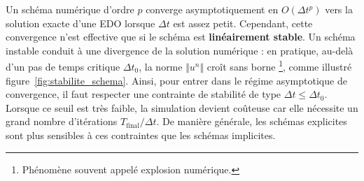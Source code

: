 Un schéma numérique d'ordre $p$ converge asymptotiquement en $O(\Delta t^p)$ vers la solution exacte d'une EDO lorsque $\Delta t$ est assez petit.
Cependant, cette convergence n'est effective que si le schéma est \textbf{linéairement stable}.  
Un schéma instable conduit à une divergence de la solution numérique : en pratique, au-delà d'un pas de temps critique $\Delta t_0$, la norme $\Vert u^n \Vert$ croît sans borne%
\footnote{Phénomène souvent appelé \og explosion numérique\fg.}, comme illustré figure~\ref{fig:stabilite_schema}.
Ainsi, pour entrer dans le régime asymptotique de convergence, il faut respecter une contrainte de stabilité de type $\Delta t \leq \Delta t_0$.  
Lorsque ce seuil est très faible, la simulation devient coûteuse car elle nécessite un grand nombre d'itérations $T_\mathrm{final}/\Delta t$.  
De manière générale, les schémas explicites sont plus sensibles à ces contraintes que les schémas implicites.

